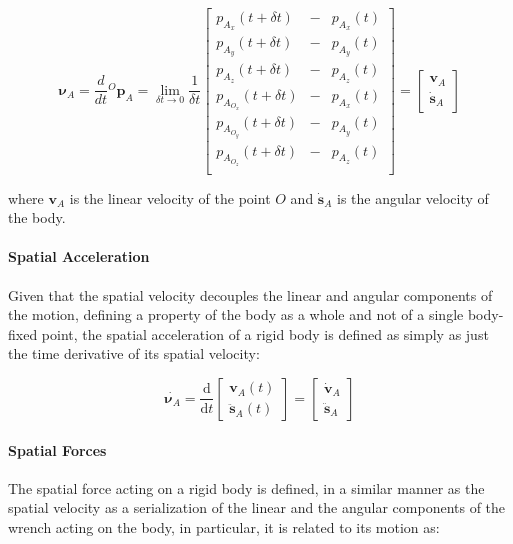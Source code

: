 \begin{equation}
    \boldsymbol{\nu} _A = \frac{d}{dt} {}^O\mathbf{p} _A =
    \lim _{\delta t \to 0} \frac{1}{\delta t}
    \begin{bmatrix}
        p _{A _x} (t + \delta t)     & - & p _{A _x} (t) \\
        p _{A _y} (t + \delta t)     & - & p _{A _y} (t) \\
        p _{A _z} (t + \delta t)     & - & p _{A _z} (t) \\
        p _{A _{O_x}} (t + \delta t) & - & p _{A _x} (t) \\
        p _{A _{O_y}} (t + \delta t) & - & p _{A _y} (t) \\
        p _{A _{O_z}} (t + \delta t) & - & p _{A _z} (t) \\
    \end{bmatrix}
    = \begin{bmatrix}
        \mathbf{v} _A \\
        \dot{\mathbf{s}} _A
    \end{bmatrix}
\end{equation}

where $\mathbf{v} _A$ is the linear velocity of the point $O$ and $\dot{\mathbf{s}} _A$ is the angular velocity of the body.

\paragraph{Spatial Acceleration} Given that the spatial velocity decouples the linear and angular components of the motion, defining a property of the body as a whole and not of a single body-fixed point, the spatial acceleration of a rigid body is defined as simply as just the time derivative of its spatial velocity:

\begin{equation}
    \dot{\boldsymbol{\nu} _A} = \frac{\mathrm{d}}{\mathrm{d}t} \begin{bmatrix}
        \mathbf{v} _A (t) \\
        \ddot{\mathbf{s}} _A (t)
    \end{bmatrix}
    =
    \begin{bmatrix}
        \dot{\mathbf{v}} _A \\
        \ddot{\mathbf{s}} _A
    \end{bmatrix}
\end{equation}

\paragraph{Spatial Forces} The spatial force acting on a rigid body is defined, in a similar manner as the spatial velocity as a serialization of the linear and the angular components of the wrench acting on the body, in particular, it is related to its motion as:


